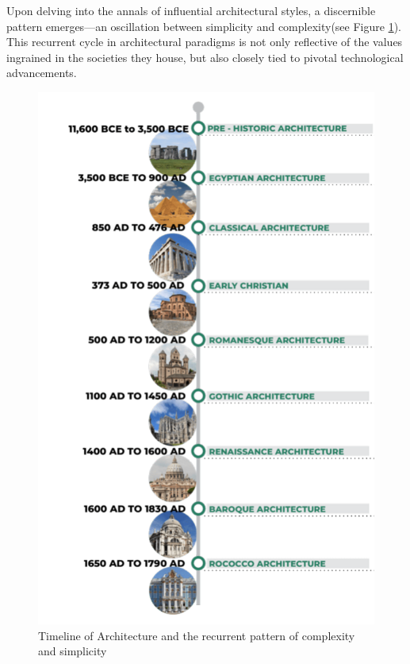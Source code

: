Upon delving into the annals of influential architectural styles, a discernible pattern emerges—an oscillation between simplicity and complexity(see Figure \ref{fig:TimelineArchitecture}).
This recurrent cycle in architectural paradigms is not only reflective of the values ingrained in the societies they house, but also closely tied to pivotal technological advancements.

     \begin{figure}[htb]
          \centering
          \includegraphics[width= \linewidth]{Images/TimelineArchitecture}
          \caption{Timeline of Architecture and the recurrent pattern of complexity and simplicity}
          \label{fig:TimelineArchitecture}
        \end{figure}

